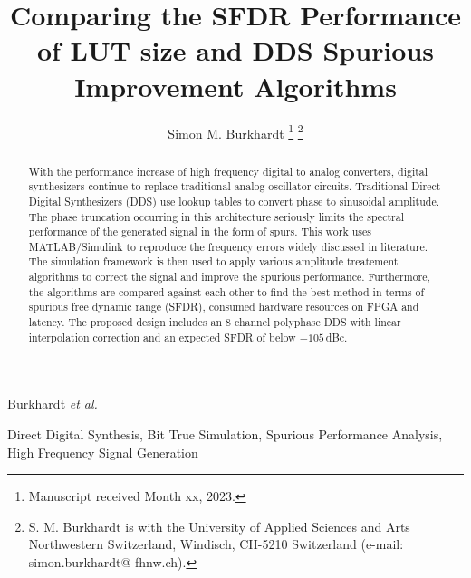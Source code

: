 \documentclass[lettersize,journal]{IEEEtran}
\begin{document}
	
	\title{Comparing the SFDR Performance of LUT size and DDS Spurious Improvement Algorithms}
	
	\author{Simon M. Burkhardt  \textsuperscript{\large{}}
		\thanks{Manuscript received Month xx, 2023.}
		\thanks{S. M. Burkhardt is with the University of Applied Sciences and Arts Northwestern Switzerland, Windisch, CH-5210 Switzerland (e-mail: simon.burkhardt@ fhnw.ch).}
	}
	
	{Burkhardt \MakeLowercase{\textit{et al.}} }
	

\maketitle

		\begin{abstract}
	With the performance increase of high frequency digital to analog converters, digital synthesizers continue to replace traditional analog oscillator circuits. Traditional Direct Digital Synthesizers (DDS) use lookup tables to convert phase to sinusoidal amplitude. The phase truncation occurring in this architecture seriously limits the spectral performance of the generated signal in the form of spurs. This work uses MATLAB/Simulink to reproduce the frequency errors widely discussed in literature. The simulation framework is then used to apply various amplitude treatement algorithms to correct the signal and improve the spurious performance. Furthermore, the algorithms are compared against each other to ﬁnd the best method in terms of spurious free dynamic range (SFDR), consumed hardware resources on FPGA and latency. The proposed design includes an 8 channel polyphase DDS with linear interpolation correction and an expected SFDR of below $-105$\,dBc.	
	\end{abstract}


\begin{IEEEkeywords}
	Direct Digital Synthesis, Bit True Simulation, Spurious Performance Analysis, High Frequency Signal Generation
\end{IEEEkeywords}
\end{document}
